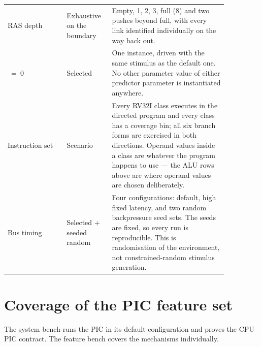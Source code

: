 {\begin{longtable}{@{}L{0.24\linewidth}L{0.15\linewidth}L{0.47\linewidth}@{}}
RAS depth & Exhaustive on the boundary &
  Empty, 1, 2, 3, full (8) and two pushes beyond full, with every link
  identified individually on the way back out. \\
~=~0 & Selected &
  One instance, driven with the same stimulus as the default one. No other
  parameter value of either predictor parameter is instantiated anywhere. \\
\midrule
Instruction set & Scenario &
  Every RV32I class executes in the directed program and every class has a
  coverage bin; all six branch forms are exercised in both directions. Operand
  values inside a class are whatever the program happens to use --- the ALU
  rows above are where operand values are chosen deliberately. \\
Bus timing & Selected + seeded random &
  Four configurations: default, high fixed latency, and two random
   backpressure seed sets. The seeds are fixed, so every run is
  reproducible. This is randomisation of the environment, not
  constrained-random stimulus generation. \\
\end{longtable}}

\section{Coverage of the PIC feature set}

The system bench runs the PIC in its default configuration and proves the
CPU--PIC contract. The feature bench covers the mechanisms individually.

